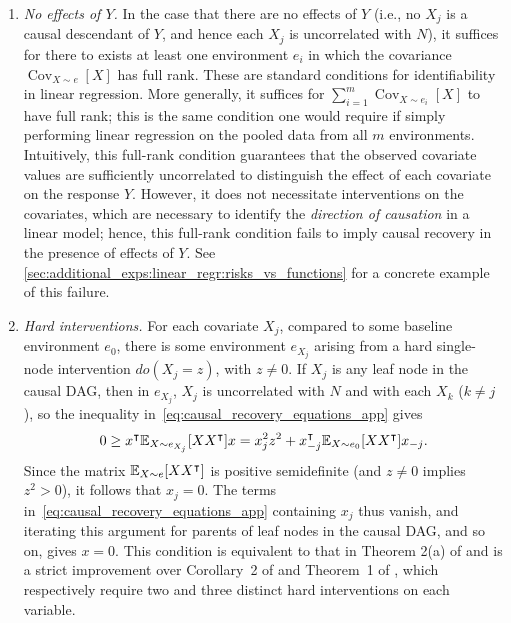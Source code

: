 \documentclass{article}
\begin{document}
%
%
%
%
%
%
%
\begin{enumerate}[itemsep=1em]
    \item \textit{No effects of $Y$.} In the case that there are no effects of $Y$ (i.e., no $X_j$ is a causal descendant of $Y$, and hence each $X_j$ is uncorrelated with $N$), it suffices for there to exists at least one environment $e_i$ in which the covariance $\operatorname{Cov}_{X \sim e}[X]$ has full rank. These are standard conditions for identifiability in linear regression. More generally, it suffices for $\sum_{i = 1}^m \operatorname{Cov}_{X \sim e_i}[X]$ to have full rank; this is the same condition one would require if simply performing linear regression on the pooled data from all $m$ environments. Intuitively, this full-rank condition guarantees that the observed covariate values are sufficiently uncorrelated to distinguish the effect of each covariate on the response $Y$. 
    However, it does not necessitate interventions on the covariates, which are necessary to identify the \emph{direction of causation} in a linear model; hence, this full-rank condition fails to imply causal recovery in the presence of effects of $Y$. See \cref{sec:additional_exps:linear_regr:risks_vs_functions} for a concrete example of this failure.

    \item \textit{\emph{Hard} interventions.} For each covariate $X_j$, compared to some baseline environment $e_0$, there is some environment $e_{X_j}$ arising from a hard single-node intervention $do(X_j = z)$, with $z \neq 0$. If $X_j$ is any leaf node in the causal DAG, then in $e_{X_j}$, $X_j$ is uncorrelated with $N$ and with each $X_k$ ($k \neq j$), so the inequality in~\eqref{eq:causal_recovery_equations_app} gives
    \begin{align*}
        0 \geq x^\intercal \mathbb{E}_{X \sim e_{X_j}}[X X^\intercal] x
          = x_j^2 z^2 + x_{-j}^\intercal \mathbb{E}_{X \sim e_0}[X X^\intercal] x_{-j}.
    \end{align*}
    Since the matrix $\mathbb{E}_{X \sim e}[X X^\intercal]$ is positive semidefinite (and $z \neq 0$ implies $z^2 > 0$), it follows that $x_j = 0$. The terms in~\eqref{eq:causal_recovery_equations_app} containing $x_j$ thus vanish, and iterating this argument for parents of leaf nodes in the causal DAG, and so on, gives $x = 0$. This condition is equivalent to that in Theorem 2(a) of \citet{peters2016causal} and is a strict improvement over Corollary~2 of \citet{yin2021optimization} and Theorem~1 of \citet{krueger21rex}, which respectively require two and three distinct hard interventions on each variable.
    

\end{enumerate}
\end{document}
